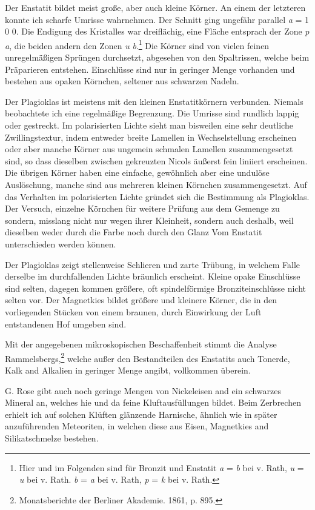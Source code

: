 \documentclass[a4paper, 11pt, oneside, polutonikogreek, german]{article}
\begin{document}
Der Enstatit bildet meist große, aber auch kleine Körner. An einem der letzteren konnte ich scharfe Umrisse wahrnehmen. Der Schnitt ging ungefähr parallel \emph{a} = 1 0 0. Die Endigung des Kristalles war dreiflächig, eine Fläche entsprach der Zone \emph{p} \emph{a},  die beiden andern den Zonen \emph{u} \emph{b}.\footnote{Hier und im Folgenden sind für Bronzit und Enstatit \emph{a} = \emph{b} bei v. Rath, \emph{u} = \emph{u} bei v. Rath. \emph{b} = \emph{a} bei v. Rath, \emph{p} = \emph{k} bei v. Rath.} Die Körner sind von vielen feinen unregelmäßigen Sprüngen durchsetzt, abgesehen von den Spaltrissen, welche beim Präparieren entstehen. Einschlüsse sind nur in geringer Menge vorhanden und bestehen aus opaken Körnchen, seltener aus schwarzen Nadeln.

Der Plagioklas ist meistens mit den kleinen Enstatitkörnern verbunden. Niemals beobachtete ich eine regelmäßige Begrenzung. Die Umrisse sind rundlich lappig oder gestreckt. Im polarisierten Lichte sieht man bisweilen eine sehr deutliche Zwillingstextur, indem entweder breite Lamellen in Wechselstellung erscheinen oder aber manche Körner aus ungemein schmalen Lamellen zusammengesetzt sind, so dass dieselben zwischen gekreuzten Nicols äußerst fein liniiert erscheinen. Die übrigen Körner haben eine einfache, gewöhnlich aber eine undulöse Auslöschung, manche sind aus mehreren kleinen Körnchen zusammengesetzt. Auf das Verhalten im polarisierten Lichte gründet sich die Bestimmung als Plagioklas. Der Versuch, einzelne Körnchen für weitere Prüfung aus dem Gemenge zu sondern, misslang nicht nur wegen ihrer Kleinheit, sondern auch deshalb, weil dieselben weder durch die Farbe noch durch den Glanz Vom Enstatit unterschieden werden können.

Der Plagioklas zeigt stellenweise Schlieren und zarte Trübung, in welchem Falle derselbe im durchfallenden Lichte bräunlich erscheint. Kleine opake Einschlüsse sind selten, dagegen kommen größere, oft spindelförmige Bronziteinschlüsse nicht selten vor. Der Magnetkies bildet größere und kleinere Körner, die in den vorliegenden Stücken von einem braunen, durch Einwirkung der Luft entstandenen Hof umgeben sind.

Mit der angegebenen mikroskopischen Beschaffenheit stimmt die Analyse Rammelsbergs,\footnote{Monatsberichte der Berliner Akademie. 1861, p. 895.} welche außer den Bestandteilen des Enstatits auch Tonerde, Kalk and Alkalien in geringer Menge angibt, vollkommen überein.

G. Rose gibt auch noch geringe Mengen von Nickeleisen and ein schwarzes Mineral an, welches hie und da feine Kluftausfüllungen bildet. Beim Zerbrechen erhielt ich auf solchen Klüften glänzende Harnische, ähnlich wie in später anzuführenden Meteoriten, in welchen diese aus Eisen, Magnetkies and Silikatschmelze bestehen.
\end{document}
